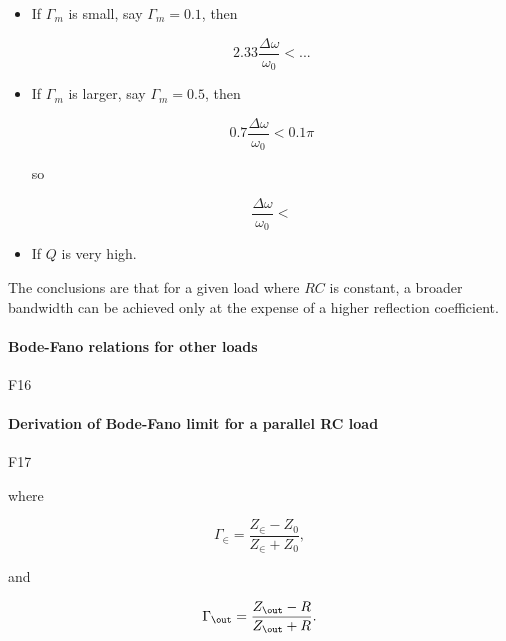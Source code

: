 \begin{itemize}
\item
If \( \Gamma_m \) is small, say \( \Gamma_m = 0.1 \), then

\begin{equation}\label{eqn:uwavesDeck8ResonatorQfactorCore:n}
2.33 \frac{ \Delta \omega}{\omega_0} < ...
\end{equation}

\item
If \( \Gamma_m \) is larger, say \( \Gamma_m = 0.5 \), then

\begin{equation}\label{eqn:uwavesDeck8ResonatorQfactorCore:n}
0.7 \frac{ \Delta \omega}{\omega_0}  < 0.1 \pi
\end{equation}

so

\begin{equation}\label{eqn:uwavesDeck8ResonatorQfactorCore:n}
\frac{ \Delta \omega}{\omega_0 } <
\end{equation}

\item If \( Q \) is very high.
\end{itemize}

The conclusions are that for a given load where \( R C \) is constant, a broader bandwidth can be achieved only at the expense of a higher reflection coefficient.

\paragraph{Bode-Fano relations for other loads}

F16

\paragraph{Derivation of Bode-Fano limit for a parallel RC load}

F17

where

\begin{equation}\label{eqn:uwavesDeck8ResonatorQfactorCore:n}
\Gamma_\in = \frac{Z_\in - Z_0}{Z_\in + Z_0},
\end{equation}

and

\begin{equation}\label{eqn:uwavesDeck8ResonatorQfactorCore:n}
\Gamma_\out = \frac{Z_\out - R }{Z_\out + R}.
\end{equation}


